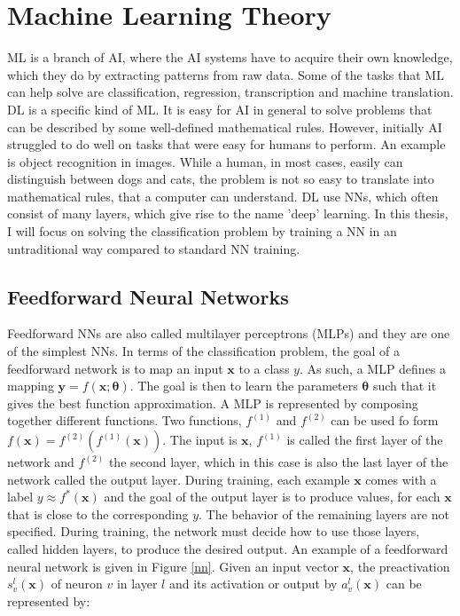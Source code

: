 \section{Machine Learning Theory}
ML is a branch of AI, where the AI systems have to acquire their own knowledge, which they do by extracting patterns from raw data. Some of the tasks that ML can help solve are classification, regression, transcription and machine translation. DL is a specific kind of ML. It is easy for AI in general to solve problems that can be described by some well-defined mathematical rules. However, initially AI struggled to do well on tasks that were easy for humans to perform. An example is object recognition in images. While a human, in most cases, easily can distinguish between dogs and cats, the problem is not so easy to translate into mathematical rules, that a computer can understand. DL use NNs, which often consist of many layers, which give rise to the name 'deep' learning. In this thesis, I will focus on solving the classification problem by training a NN in an untraditional way compared to standard NN training. 

\subsection{Feedforward Neural Networks}
Feedforward NNs are also called multilayer perceptrons (MLPs) and they are one of the simplest NNs. In terms of the classification problem, the goal of a feedforward network is to map an input $\mathbf{x}$ to a class $y$. As such, a MLP defines a mapping $\mathbf{y} = f(\mathbf{x}; \boldsymbol{\theta})$. The goal is then to learn the parameters $\boldsymbol{\theta}$ such that it gives the best function approximation. A MLP is represented by composing together different functions. Two functions, $f^{(1)}$ and $f^{(2)}$ can be used fo form $f(\mathbf{x}) = f^{(2)}(f^{(1)}(\mathbf{x}))$. The input is $\mathbf{x}$, $f^{(1)}$ is called the first layer of the network and $f^{(2)}$ the second layer, which in this case is also the last layer of the network called the output layer. During training, each example $\mathbf{x}$ comes with a label $y \approx f^*(\mathbf{x})$ and the goal of the output layer is to produce values, for each $\mathbf{x}$ that is close to the corresponding $y$. The behavior of the remaining layers are not specified. During training, the network must decide how to use those layers, called hidden layers, to produce the desired output. An example of a feedforward neural network is given in Figure \ref{nn}. Given an input vector $\mathbf{x}$, the preactivation $s_{v}^l(\mathbf{x})$ of neuron $v$ in layer $l$ and its activation or output by $a_{v}^l(\mathbf{x})$ can be represented by:

